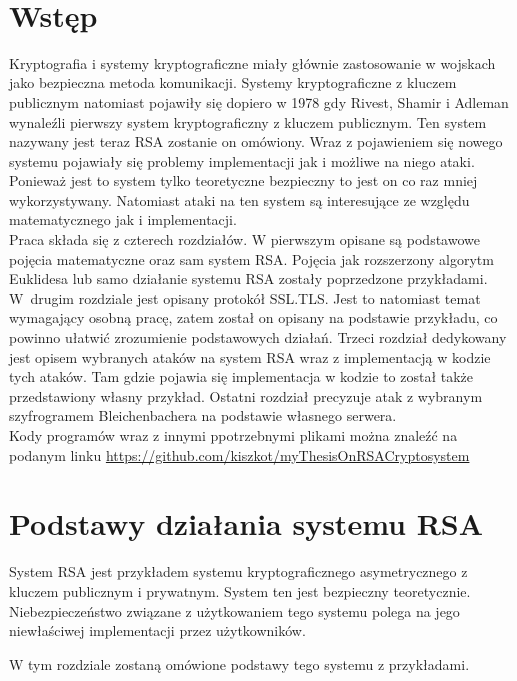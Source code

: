 \documentclass[12pt,twoside,a4]{mwbk}
\theoremstyle{definition}
\begin{document}
\newpage
\mbox{ }

\newpage
\pagestyle{fancy}
\tableofcontents



\chapter*{Wstęp}
Kryptografia i systemy kryptograficzne miały głównie zastosowanie w wojskach jako bezpieczna metoda komunikacji. Systemy kryptograficzne z kluczem publicznym natomiast pojawiły się dopiero w 1978 gdy Rivest, Shamir i Adleman wynaleźli pierwszy system kryptograficzny z kluczem publicznym. Ten system nazywany jest teraz RSA zostanie on omówiony. Wraz z pojawieniem się nowego systemu pojawiały się problemy implementacji jak i możliwe na niego ataki. Ponieważ jest to system tylko teoretyczne bezpieczny to jest on co raz mniej wykorzystywany. Natomiast ataki na ten system są interesujące ze względu matematycznego jak i implementacji. \\

Praca składa się z czterech rozdziałów. W pierwszym opisane są podstawowe pojęcia matematyczne oraz sam system RSA. Pojęcia jak rozszerzony algorytm Euklidesa lub samo działanie systemu RSA zostały poprzedzone przykładami. W~drugim rozdziale jest opisany protokół SSL.TLS. Jest to natomiast temat wymagający osobną pracę, zatem został on opisany na podstawie przykładu, co powinno ułatwić zrozumienie podstawowych działań. Trzeci rozdział dedykowany jest opisem wybranych ataków na system RSA wraz z implementacją w kodzie tych ataków. Tam gdzie pojawia się implementacja w kodzie to został także przedstawiony własny przykład. Ostatni rozdział precyzuje atak z wybranym szyfrogramem Bleichenbachera na podstawie własnego serwera. \\

Kody programów wraz z innymi ppotrzebnymi plikami można znaleźć na podanym linku \url{https://github.com/kiszkot/myThesisOnRSACryptosystem}




\chapter{Podstawy działania systemu RSA}
System RSA jest przykładem systemu kryptograficznego asymetrycznego z kluczem publicznym i prywatnym. System ten jest bezpieczny teoretycznie. Niebezpieczeństwo związane z użytkowaniem tego systemu polega na jego niewłaściwej implementacji przez użytkowników. \\ \par
W tym rozdziale zostaną omówione podstawy tego systemu z przykładami.
\end{document}
